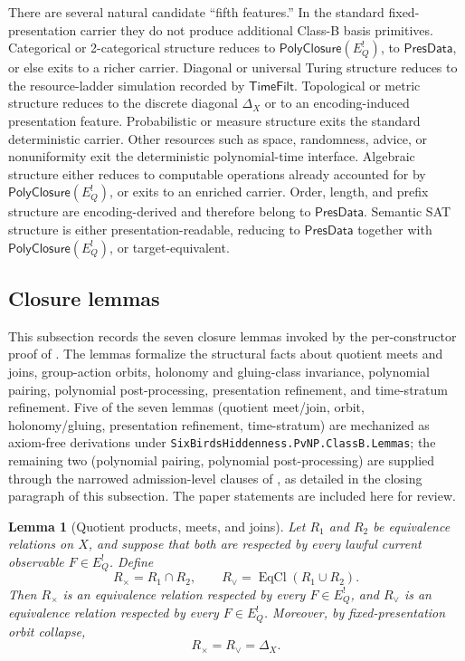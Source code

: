 \documentclass[11pt]{article}
\newcommand{\EQbang}{E^{!}_{Q}}
\newtheorem{lemma}[theorem]{Lemma}
\theoremstyle{definition}
\begin{document}
There are several natural candidate ``fifth features.''  In the
standard fixed-presentation carrier they do not produce additional
Class-B basis primitives.  Categorical or 2-categorical structure
reduces to \(\mathsf{PolyClosure}(\EQbang)\), to
\(\mathsf{PresData}\), or else exits to a richer carrier.  Diagonal or
universal Turing structure reduces to the resource-ladder simulation
recorded by \(\mathsf{TimeFilt}\).  Topological or metric structure
reduces to the discrete diagonal \(\Delta_X\) or to an encoding-induced
presentation feature.  Probabilistic or measure structure exits the
standard deterministic carrier.  Other resources such as space,
randomness, advice, or nonuniformity exit the deterministic
polynomial-time interface.  Algebraic structure either reduces to
computable operations already accounted for by
\(\mathsf{PolyClosure}(\EQbang)\), or exits to an enriched carrier.
Order, length, and prefix structure are encoding-derived and therefore
belong to \(\mathsf{PresData}\).  Semantic SAT structure is either
presentation-readable, reducing to \(\mathsf{PresData}\) together with
\(\mathsf{PolyClosure}(\EQbang)\), or target-equivalent.

\subsection{Closure lemmas}
\label{app:class-b-closure-lemmas}

This subsection records the seven closure lemmas invoked by the
per-constructor proof of .
The lemmas formalize the structural facts about quotient meets and
joins, group-action orbits, holonomy and gluing-class invariance,
polynomial pairing, polynomial post-processing, presentation
refinement, and time-stratum refinement.  Five of the seven lemmas
(quotient meet/join, orbit, holonomy/gluing, presentation refinement,
time-stratum) are mechanized as axiom-free derivations under
\texttt{SixBirdsHiddenness.PvNP.ClassB.Lemmas}; the remaining two
(polynomial pairing, polynomial post-processing) are supplied through
the narrowed admission-level clauses of
, as detailed in the closing
paragraph of this subsection.  The paper statements are included here
for review.

\begin{lemma}[Quotient products, meets, and joins]
\label{lem:pvnp:quotient-meet-join}
Let \(R_1\) and \(R_2\) be equivalence relations on \(X\), and suppose
that both are respected by every lawful current observable
\(F\in\EQbang\).  Define
\[
  R_{\times}=R_1\cap R_2,
  \qquad
  R_{\vee}=\operatorname{EqCl}(R_1\cup R_2).
\]
Then \(R_{\times}\) is an equivalence relation respected by every
\(F\in\EQbang\), and \(R_{\vee}\) is an equivalence relation respected
by every \(F\in\EQbang\).  Moreover, by fixed-presentation orbit
collapse,
\[
  R_{\times}=R_{\vee}=\Delta_X .
\]
\end{lemma}
\end{document}

